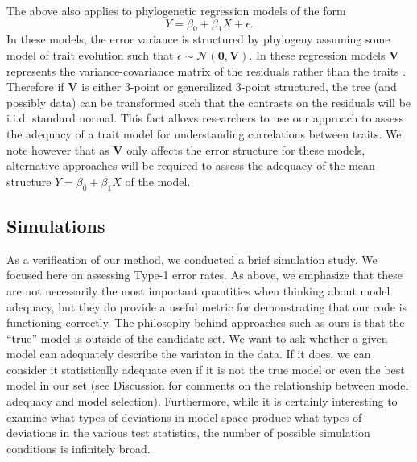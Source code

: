 The above also applies to phylogenetic regression models \citep{Grafen1989, Lynch1991, MartinsHansen1997} of the form
\[Y = \beta_{\text{0}} + \beta_{\text{1}} X + \epsilon.\]
In these models, the error variance is structured by phylogeny assuming some model of trait evolution such that $\epsilon \sim \mathcal{N}(\textbf{0}, \mathbf{V})$. In these regression models $\mathbf{V}$ represents the variance-covariance matrix of the residuals rather than the traits \citep{Rohlf2001}. Therefore if $\mathbf{V}$ is either 3-point or generalized 3-point structured, the tree (and possibly data) can be transformed such that the contrasts on the residuals will be i.i.d. standard normal. This fact allows researchers to use our approach to assess the adequacy of a trait model for understanding correlations between traits. We note however that as $\mathbf{V}$ only affects the error structure for these models, alternative approaches \citep[see for example][ch. 6]{Gelmanbook} will be required to assess the adequacy of the mean structure $Y = \beta_{\text{0}} + \beta_{\text{1}}X$ of the model.

\subsection{Simulations}

As a verification of our method, we conducted a brief simulation study. We focused here on assessing Type-1 error rates. As above, we emphasize that these are not necessarily the most important quantities when thinking about model adequacy, but they do provide a useful metric for demonstrating that our code is functioning correctly. The philosophy behind approaches such as ours is that the ``true'' model is outside of the candidate set. We want to ask whether a given model can adequately describe the variaton in the data. If it does, we can consider it statistically adequate even if it is not the true model or even the best model in our set (see Discussion for comments on the relationship between model adequacy and model selection). Furthermore, while it is certainly interesting to examine what types of deviations in model space produce what types of deviations in the various test statistics, the number of possible simulation conditions is infinitely broad.

